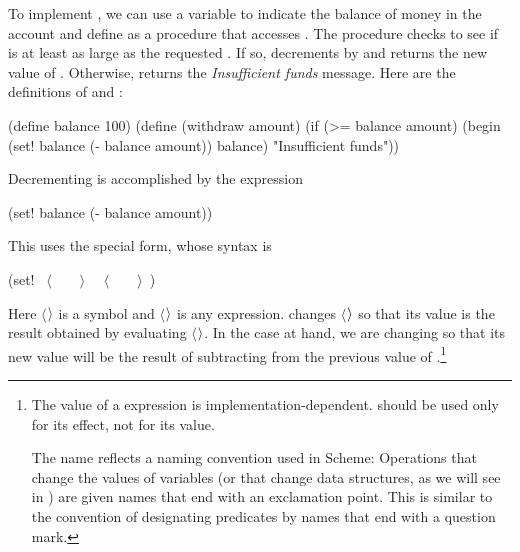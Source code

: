 To implement , we can use a variable  to indicate
the balance of money in the account and define  as a procedure
that accesses .  The  procedure checks to see if
 is at least as large as the requested .  If so,
 decrements  by  and returns the new
value of .  Otherwise,  returns the
\emph{Insufficient funds} message.  Here are the definitions of 
and :

\begin{codeBlock}
(define balance 100)
(define (withdraw amount)
  (if (>= balance amount)
      (begin (set! balance (- balance amount))
             balance)
      "Insufficient funds"))
\end{codeBlock}

\noindent
Decrementing  is accomplished by the expression

\begin{codeBlock}
(set! balance (- balance amount))
\end{codeBlock}

\noindent
This uses the  special form, whose syntax is

\begin{codeBlock}
(set! ~\(\langle \)~~~~\(\rangle \)~ ~\(\langle \)~~~~\(\rangle \)~)
\end{codeBlock}

\noindent
Here \( \langle \)\( \kern0.04em\rangle \) is a symbol and \( \langle \)\( \kern0.04em\rangle \) is any expression.
 changes \( \langle \)\( \kern0.04em\rangle \) so that its value is the result obtained by
evaluating \( \langle \)\( \kern0.04em\rangle \).  In the case at hand, we are changing
 so that its new value will be the result of subtracting
 from the previous value of .\footnote{The value of
a  expression is implementation-dependent.   should be
used only for its effect, not for its value.

The name  reflects a naming convention used in Scheme: Operations
that change the values of variables (or that change data structures, as we will
see in ) are given names that end with an exclamation point.
This is similar to the convention of designating predicates by names that end
with a question mark.}

